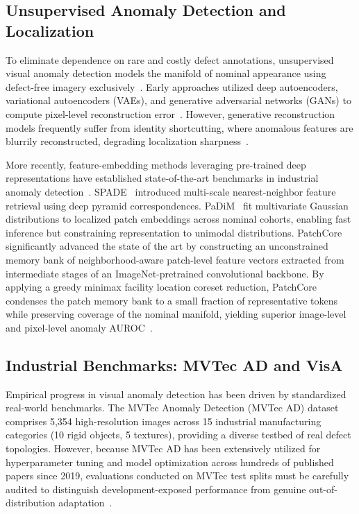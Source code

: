 \documentclass[journal]{IEEEtran}
\begin{document}
\subsection{Unsupervised Anomaly Detection and Localization}
To eliminate dependence on rare and costly defect annotations, unsupervised visual anomaly detection models the manifold of nominal appearance using defect-free imagery exclusively~\cite{roth2022towards,bergmann2021mvtec}. Early approaches utilized deep autoencoders, variational autoencoders (VAEs), and generative adversarial networks (GANs) to compute pixel-level reconstruction error~\cite{bergmann2021mvtec}. However, generative reconstruction models frequently suffer from identity shortcutting, where anomalous features are blurrily reconstructed, degrading localization sharpness~\cite{roth2022towards}.

More recently, feature-embedding methods leveraging pre-trained deep representations have established state-of-the-art benchmarks in industrial anomaly detection~\cite{roth2022towards,defard2021padim,cohen2020sub}. SPADE~\cite{cohen2020sub} introduced multi-scale nearest-neighbor feature retrieval using deep pyramid correspondences. PaDiM~\cite{defard2021padim} fit multivariate Gaussian distributions to localized patch embeddings across nominal cohorts, enabling fast inference but constraining representation to unimodal distributions. PatchCore~\cite{roth2022towards} significantly advanced the state of the art by constructing an unconstrained memory bank of neighborhood-aware patch-level feature vectors extracted from intermediate stages of an ImageNet-pretrained convolutional backbone. By applying a greedy minimax facility location coreset reduction, PatchCore condenses the patch memory bank to a small fraction of representative tokens while preserving coverage of the nominal manifold, yielding superior image-level and pixel-level anomaly AUROC~\cite{roth2022towards}.

\subsection{Industrial Benchmarks: MVTec AD and VisA}
Empirical progress in visual anomaly detection has been driven by standardized real-world benchmarks. The MVTec Anomaly Detection (MVTec AD) dataset~\cite{bergmann2021mvtec} comprises 5,354 high-resolution images across 15 industrial manufacturing categories (10 rigid objects, 5 textures), providing a diverse testbed of real defect topologies. However, because MVTec AD has been extensively utilized for hyperparameter tuning and model optimization across hundreds of published papers since 2019, evaluations conducted on MVTec test splits must be carefully audited to distinguish development-exposed performance from genuine out-of-distribution adaptation~\cite{bergmann2021mvtec}. 
\end{document}
